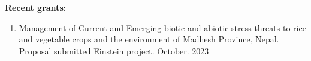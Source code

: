 \documentclass[margin,10pt]{res} %
\begin{document}
\begin{resume}
{\noindent
\textbf{Recent grants:}\\
\begin{enumerate}[$\circ$]
\item Management of Current and Emerging biotic and abiotic stress threats
to rice and vegetable crops and the environment of Madhesh Province, Nepal.
Proposal submitted Einstein project. October. 2023
\end{enumerate}
}

\iftoggle{compact}{
\section{\textnormal{\textsc{Selected awards}}}
}{
}
\end{resume}
\end{document}
